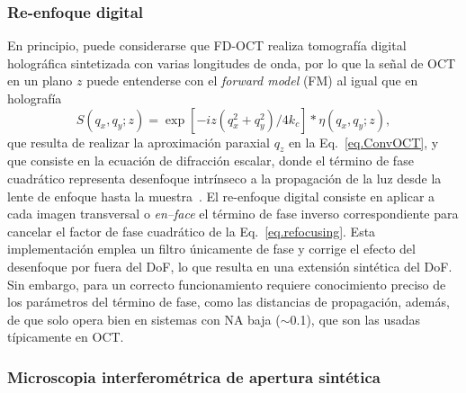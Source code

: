\documentclass[letter, 12 pt]{article}
\begin{document}
\subsubsection{Re-enfoque digital}

En principio, puede considerarse que FD-OCT realiza tomografía digital holográfica sintetizada con varias longitudes de onda, por lo que la señal de OCT en un plano $z$ puede entenderse con el \textit{forward model} (FM) al igual que en holografía~\cite{Yu2007_Digital}
    \begin{equation}\label{eq.refocusing}
S(q_x, q_y; z) = \exp[-iz(q_x^2 + q_y^2)/4k_c] \ast \eta(q_x, q_y; z),
    \end{equation}
que resulta de realizar la aproximación paraxial $q_z$ en la Eq.~\eqref{eq.ConvOCT}, y que consiste en la ecuación de difracción escalar, donde el término de fase cuadrático representa desenfoque intrínseco a la propagación de la luz desde la lente de enfoque hasta la muestra~\cite{yasuno2006}. El re-enfoque digital consiste en aplicar a cada imagen transversal o \textit{en--face} el término de fase inverso correspondiente para cancelar el factor de fase cuadrático de la Eq.~\eqref{eq.refocusing}. Esta implementación emplea un filtro únicamente de fase y corrige el efecto del desenfoque por fuera del DoF, lo que resulta en una extensión sintética del DoF. Sin embargo, para un correcto funcionamiento requiere conocimiento preciso de los parámetros del término de fase, como las distancias de propagación, además, de que solo opera bien en sistemas con NA baja ($\sim$0.1), que son las usadas típicamente en OCT.

\subsubsection{Microscopia interferométrica de apertura sintética}
\end{document}
